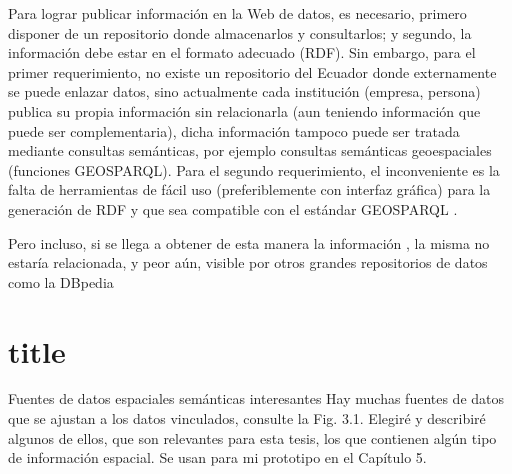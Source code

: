 Para lograr publicar información  en la Web de datos, es necesario, primero disponer de un repositorio donde almacenarlos y consultarlos; y segundo, la información  debe estar en el formato adecuado (RDF). Sin embargo, para el primer requerimiento, no existe un repositorio del Ecuador donde externamente se puede enlazar datos, sino actualmente cada institución (empresa, persona) publica su propia información  sin relacionarla (aun teniendo información  que puede ser complementaria), dicha información  tampoco puede ser tratada mediante consultas semánticas, por ejemplo consultas semánticas geoespaciales (funciones GEOSPARQL). Para el segundo requerimiento, el inconveniente es la falta de herramientas de fácil uso (preferiblemente con interfaz gráfica) para la generación de RDF y que sea compatible con el estándar GEOSPARQL . 

Pero incluso, si se llega a obtener de esta manera la información , la misma no estaría relacionada, y peor aún, visible por otros grandes repositorios de datos como la DBpedia

\section{title}
Fuentes de datos espaciales semánticas interesantes
Hay muchas fuentes de datos que se ajustan a los datos vinculados, consulte la Fig. 3.1. Elegiré y describiré algunos de ellos, que son relevantes para esta tesis, los que contienen algún tipo de información espacial. Se usan para mi prototipo en el Capítulo 5.





